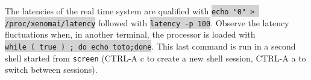 \documentclass{article}
\begin{document}
{{The latencies of the real time system \cite{blaes} are qualified with
\colorbox{lightgray}{\verb~echo "0" > /proc/xenomai/latency~} followed with
\colorbox{lightgray}{\verb~latency -p 100~}. Observe the latency fluctuations when, in another
terminal, the processor is loaded with\\
\colorbox{lightgray}{\verb~while ( true ) ; do echo toto;done~}. This last command is run in a second
shell started from {\tt screen} (CTRL-A c to create a new shell session, CTRL-A a to switch between
sessions).

%
%
}}
\end{document}
